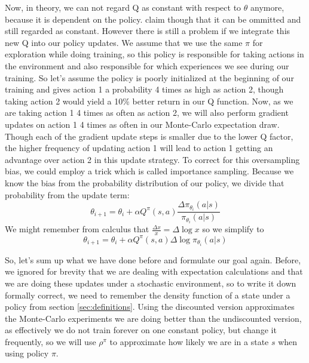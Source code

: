 \documentclass[hyperref,beleg]{cgvpub}
\begin{document}
Now, in theory, we can not regard Q as constant with respect to $\theta$ anymore, because it is dependent on the policy. \cite{suttonPolicyGradientMethods} claim though that it can be ommitted and still regarded as constant. However there is still a problem if we integrate this new Q into our policy updates. We assume that we use the same $\pi$ for exploration while doing training, so this policy is responsible for taking actions in the environment and also responsible for which experiences we see during our training. So let's assume the policy is poorly initialized at the beginning of our training and gives action 1 a probability 4 times as high as action 2, though taking action 2 would yield a 10\% better return in our Q function. Now, as we are taking action 1 4 times as often as action 2, we will also perform gradient updates on action 1 4 times as often in our Monte-Carlo expectation draw. Though each of the gradient update steps is smaller due to the lower Q factor, the higher frequency of updating action 1 will lead to action 1 getting an advantage over action 2 in this update strategy. To correct for this oversampling bias, we could employ a trick which is called importance sampling. Because we know the bias from the probability distribution of our policy, we divide that probability from the update term:
\begin{equation}
\theta_{i+1} = \theta_i + \alpha Q^{\pi}(s, a) \frac{ \Delta \pi_{\theta_i}(a|s)}{\pi_{\theta_i}(a|s)}
\end{equation}
We might remember from calculus that $\frac{\Delta x}{x} = \Delta \log x$ so we simplify to
\begin{equation}
\theta_{i+1} = \theta_i + \alpha Q^{\pi}(s, a) \Delta \log \pi_{\theta_i}(a|s)
\label{equ:pg_update}
\end{equation}

So, let's sum up what we have done before and formulate our goal again. Before, we ignored for brevity that we are dealing with expectation calculations and that we are doing these updates under a stochastic environment, so to write it down formally correct, we need to remember the density function of a state under a policy from section \ref{sec:definitions}. Using the discounted version approximates the Monte-Carlo experiments we are doing better than the undiscounted version, as effectively we do not train forever on one constant policy, but change it frequently, so we will use $\rho^{\pi}$ to approximate how likely we are in a state $s$ when using policy $\pi$.
\end{document}
